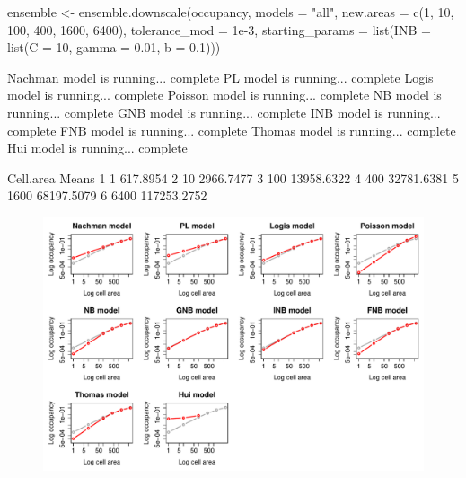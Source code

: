 \documentclass{article}[12pt, a4paper]
\begin{document}
\begin{Schunk}
\begin{Sinput}
ensemble <- ensemble.downscale(occupancy,
                               models = "all",
                               new.areas = c(1, 10, 100, 400, 1600, 6400),
                               tolerance_mod = 1e-3,
                               starting_params = list(INB = list(C = 10, 
                                                                 gamma = 0.01, 
                                                                 b = 0.1)))
\end{Sinput}
\begin{Soutput}
Nachman model is running...  complete 
PL model is running...  complete 
Logis model is running...  complete 
Poisson model is running...  complete 
NB model is running...  complete 
GNB model is running...  complete 
INB model is running...  complete 
FNB model is running...  complete 
Thomas model is running...  complete 
Hui model is running...  complete 





\end{Soutput}


\begin{Soutput}
  Cell.area       Means
1         1    617.8954
2        10   2966.7477
3       100  13958.6322
4       400  32781.6381
5      1600  68197.5079
6      6400 117253.2752
\end{Soutput}
\end{Schunk}

\begin{figure}[!ht]
\centering
\includegraphics[width=\linewidth]{Downscaling-downscale36}
\end{figure}
\end{document}
